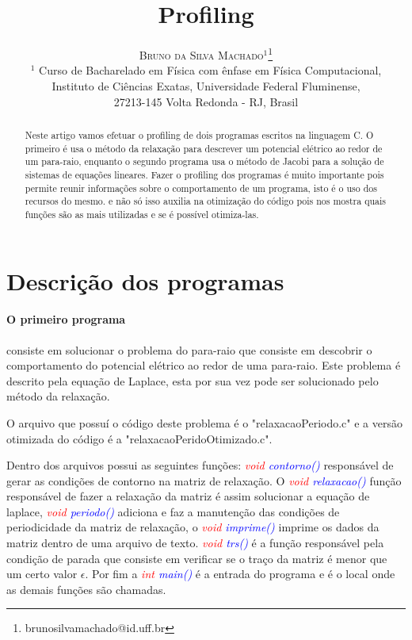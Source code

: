 \documentclass[]{article}
\title{\vspace{-5mm}\fontsize{18pt}{10pt} \bfseries{Profiling}}
\author{\large 
	\textsc{Bruno da Silva Machado$^{1}$}\thanks{brunosilvamachado@id.uff.br} 
	\quad
	\\[2mm] \normalsize 
	$^1$ Curso de Bacharelado em Física com ênfase em Física Computacional,\\ Instituto de Ciências Exatas, Universidade Federal Fluminense,\\ 
	27213-145 Volta Redonda - RJ, Brasil\\
	\vspace{-5mm}
}
\begin{document}
\maketitle

\begin{abstract}

Neste artigo vamos efetuar o profiling de dois programas escritos na linguagem C. O primeiro é usa o método da relaxação para descrever um potencial elétrico ao redor de um para-raio, enquanto o segundo programa usa o método de Jacobi para a solução de sistemas de equações lineares. Fazer o profiling dos programas é muito importante pois permite reunir informações sobre o comportamento de um programa, isto é o uso dos recursos do mesmo. e não só isso auxilia na otimização do código pois nos mostra quais funções são as mais utilizadas e se é possível otimiza-las.

\end{abstract}

\section{Descrição dos programas}

\paragraph{O primeiro programa} consiste em solucionar o problema do para-raio que consiste em descobrir o comportamento do potencial elétrico ao redor de uma para-raio. Este problema é descrito pela equação de Laplace, esta por sua vez pode ser solucionado pelo método da relaxação. 

O arquivo que possuí o código deste problema é o "relaxacaoPeriodo.c" e a versão otimizada do código é a  "relaxacaoPeridoOtimizado.c". 

Dentro dos arquivos possui as seguintes funções: \textit{\textcolor{red}{void} \textcolor{blue}{contorno()}} responsável de gerar as condições de contorno na matriz de relaxação. O \textit{\textcolor{red}{void} \textcolor{blue}{relaxacao()}} função responsável de fazer a relaxação da matriz é assim solucionar a equação de laplace, \textit{\textcolor{red}{void} \textcolor{blue}{periodo()}} adiciona e faz a manutenção das condições de periodicidade da matriz de relaxação, o \textit{\textcolor{red}{void} \textcolor{blue}{imprime()}} imprime os dados da matriz dentro de uma arquivo de texto. \textit{\textcolor{red}{void} \textcolor{blue}{trs()}} é a função responsável pela condição de parada que consiste em verificar se o traço da matriz é menor que um certo valor $\epsilon$. Por fim a \textit{\textcolor{red}{int} \textcolor{blue}{main()}} é a entrada do programa e é o local onde as demais funções são chamadas.
\end{document}
